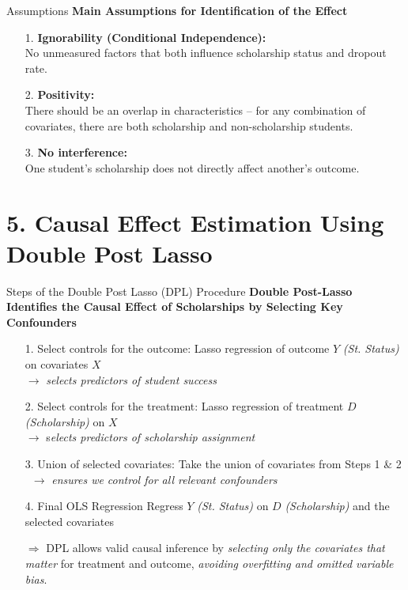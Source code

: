\documentclass[aspectratio=169]{beamer}
\begin{document}
\begin{frame}{Assumptions}
\textbf{Main Assumptions for Identification of the Effect}
\begin{itemize}
    \item [1.] \textbf{Ignorability (Conditional Independence):} \\No unmeasured factors that both influence scholarship status and dropout rate.
    \item [2.] \textbf{Positivity:} \\There should be an overlap in characteristics – for any combination of covariates, there are both scholarship and non-scholarship students.
    \item [3.] \textbf{No interference:} \\One student’s scholarship does not directly affect another’s outcome.
\end{itemize}

\end{frame}


\section{5. Causal Effect Estimation Using Double Post Lasso}

\begin{frame}{Steps of the Double Post Lasso (DPL) Procedure}
\textbf{Double Post-Lasso Identifies the Causal Effect of Scholarships by Selecting Key Confounders}

\begin{itemize}
	\item[1.] Select controls for the outcome: Lasso regression of outcome $Y$ \textit{(St. Status)} on covariates $X$ \\$\rightarrow$ \textit{selects predictors of student success}
	\item[2.] Select controls for the treatment: Lasso regression of treatment $D$ \textit{(Scholarship)} on $X$ \\ $\rightarrow$ s\textit{elects predictors of scholarship assignment}
	\item[3.] Union of selected covariates: Take the union of covariates from Steps 1 \& 2 \\ $\rightarrow$ \textit{ensures we control for all relevant confounders}
	\item[4.] Final OLS Regression Regress $Y$ \textit{(St. Status)} on $D$ \textit{(Scholarship)} and the selected covariates
\end{itemize}

\begin{itemize}
	\item[$\Rightarrow$] DPL allows valid causal inference by \textit{selecting only the covariates that matter} for treatment and outcome, \textit{avoiding overfitting and omitted variable bias}.
\end{itemize}
\vspace{-10pt}
\end{frame}
\end{document}
